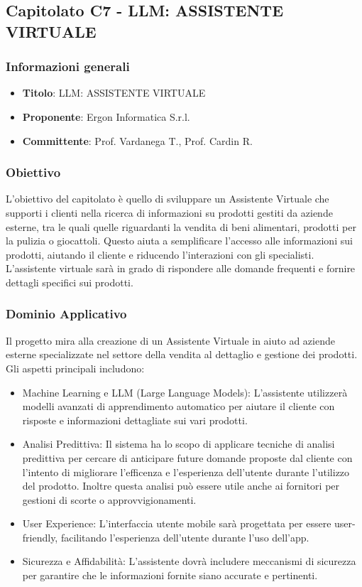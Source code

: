\subsection{Capitolato C7 - LLM: ASSISTENTE VIRTUALE}
     \subsubsection{Informazioni generali}
        \begin{itemize}
            \item \textbf{Titolo}: LLM: ASSISTENTE VIRTUALE
            \item \textbf{Proponente}: Ergon Informatica S.r.l.
            \item \textbf{Committente}: Prof. Vardanega T., Prof. Cardin R.
        \end{itemize}
    \subsubsection{Obiettivo}
    L’obiettivo del capitolato è quello di sviluppare un Assistente Virtuale che supporti i clienti nella ricerca di informazioni su prodotti gestiti da aziende esterne, tra le quali quelle riguardanti la vendita di beni alimentari, prodotti per la pulizia o giocattoli. Questo aiuta a semplificare l’accesso alle informazioni sui prodotti, aiutando il cliente e riducendo l’interazioni con gli specialisti. L’assistente virtuale sarà in grado di rispondere alle domande frequenti  e fornire dettagli specifici sui prodotti.
    \subsubsection{Dominio Applicativo}
    Il progetto mira alla creazione di un Assistente Virtuale in aiuto ad aziende esterne specializzate nel settore della vendita al dettaglio e gestione dei prodotti. Gli aspetti principali includono:
    \begin{itemize}
        \item Machine Learning e LLM (Large Language Models): L'assistente utilizzerà modelli avanzati di apprendimento automatico per aiutare il cliente con risposte e informazioni dettagliate sui vari prodotti.
        \item Analisi Predittiva: Il sistema ha lo scopo di applicare tecniche di analisi predittiva per cercare di anticipare future domande proposte dal cliente con l’intento di migliorare l’efficenza e l'esperienza dell’utente durante l’utilizzo del prodotto. Inoltre questa analisi può essere utile anche ai fornitori per gestioni di scorte o approvvigionamenti.
        \item User Experience: L'interfaccia utente mobile sarà progettata per essere user-friendly, facilitando l’esperienza dell’utente durante l’uso dell’app.
        \item Sicurezza e Affidabilità: L'assistente dovrà includere meccanismi di sicurezza per garantire che le informazioni fornite siano accurate e pertinenti.
    \end{itemize}

